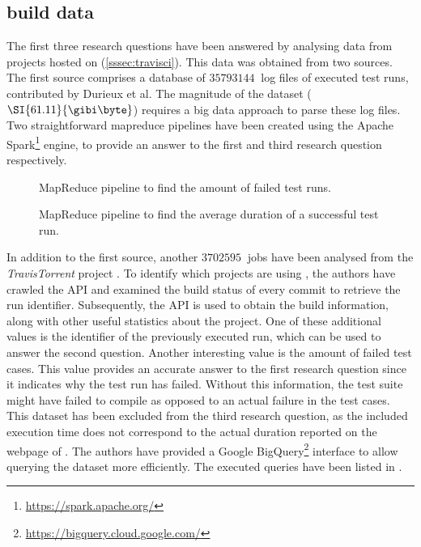 
\subsection{\travisci{} build data}
The first three research questions have been answered by analysing data from projects hosted on \travisci{} (\cref{sssec:travisci}). This data was obtained from two sources.\\

\noindent The first source comprises a database \cite{travisanalysis} of $\SI{35793144}{}$ log files of executed test runs, contributed by Durieux et al. The magnitude of the dataset ($\SI{61.11}{\gibi\byte}$) requires a big data approach to parse these log files. Two straightforward \Gls{mapreduce} pipelines have been created using the Apache Spark\footnote{\url{https://spark.apache.org/}} engine, to provide an answer to the first and third research question respectively.\\

\begin{figure}[htbp!]
	\centering
	
	\caption{MapReduce pipeline to find the amount of failed test runs.}
	\label{fig:eval-mapreduce-1}
\end{figure}

\begin{figure}[htbp!]
	\centering
	
	\caption{MapReduce pipeline to find the average duration of a successful test run.}
	\label{fig:eval-mapreduce-2}
\end{figure}

\noindent In addition to the first source, another $\SI{3702595}{}$ jobs have been analysed from the \mbox{\emph{TravisTorrent}} project \cite{msr17challenge}. To identify which projects are using \travisci{}, the authors have crawled the \github{} API and examined the build status of every commit to retrieve the run identifier. Subsequently, the \travisci{} API is used to obtain the build information, along with other useful statistics about the project. One of these additional values is the identifier of the previously executed run, which can be used to answer the second question. Another interesting value is the amount of failed test cases. This value provides an accurate answer to the first research question since it indicates why the test run has failed. Without this information, the test suite might have failed to compile as opposed to an actual failure in the test cases. This dataset has been excluded from the third research question, as the included execution time does not correspond to the actual duration reported on the webpage of \travisci{}. The authors have provided a Google BigQuery\footnote{\url{https://bigquery.cloud.google.com/}} interface to allow querying the dataset more efficiently. The executed queries have been listed in .